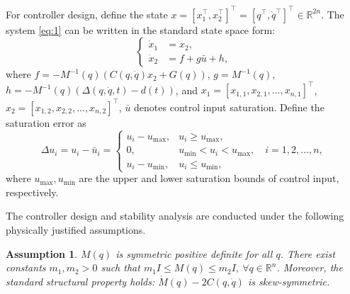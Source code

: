 \documentclass[pdflatex,sn-mathphys-num]{sn-jnl}%
\theoremstyle{thmstyleone}%
\newtheorem{assumption}{Assumption}
\theoremstyle{thmstyletwo}%
\theoremstyle{thmstylethree}%
\begin{document}
For controller design, define the state $x = [x_1^{\top},x_2^{\top}]^{\top} = [q^{\top},\dot{q}^{\top}]^{\top} \in \mathbb{R}^{2n}$. The system \cref{eq:1} can be written in the standard state space form:
\begin{equation}
	\left\{
	\begin{aligned}
		\dot{x}_1 & = x_2,     \\
		\dot{x}_2 & =f +g \bar{u} +h,
	\end{aligned}
	\right.
	\label{eq:2}
\end{equation}
where $f=-M^{-1}(q) (C(q,\dot{q})x_2 + G(q)) $, $g=M^{-1}(q)$, $h=-M^{-1}(q)(\Delta(q,\dot{q},t) - d(t))$, and $x_1=[x_{1,1},x_{2,1},...,x_{n,1}]^{\top}$, $x_2=[x_{1,2},x_{2,2},...,x_{n,2}]^{\top}$, $\bar{u}$ denotes control input saturation. Define the saturation error as
\begin{equation}\label{eq:3}
\Delta u_{i} =  u_{i}-\bar{u}_{i}=\begin{cases} 
	u_{i}-u_{\max}, & u_i \geq u_{\max}, \\
0,       & u_{\min} < u_i < u_{\max},  \quad i=1,2,...,n,\\
u_{i}-u_{\min}, & u_i \leq u_{\min},
\end{cases}
\end{equation}
where $u_{\max},u_{\min}$ are the upper and lower saturation bounds of control input, respectively.

\par The controller design and stability analysis are conducted under the following physically justified assumptions.
\begin{assumption}\cite{Spong_2022_historicalperspective}   \label{assumption:1}
	$M(q)$ is symmetric positive definite for all $q$. There exist constants $m_1,m_2>0$ such that
	$m_1 I \le M(q) \le m_2 I,\ \forall q\in\mathbb{R}^n$.
	Moreover, the standard structural property holds: $\dot M(q)-2C(q,\dot q)$ is skew-symmetric.
	\end{assumption}
	
\end{document}
